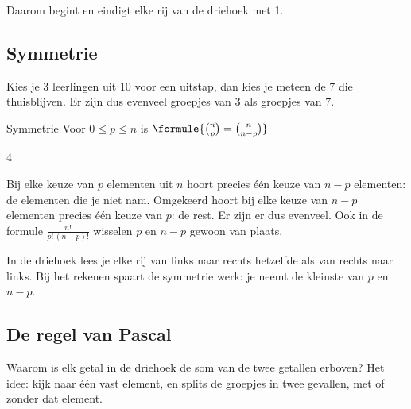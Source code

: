 Daarom begint en eindigt elke rij van de driehoek met 1.

\subsection{Symmetrie}

Kies je 3 leerlingen uit 10 voor een uitstap, dan kies je meteen de 7 die thuisblijven. Er zijn dus evenveel groepjes van 3 als groepjes van 7.

\begin{theorie}
\begin{stelling}{Symmetrie}
Voor $0 \leqslant p \leqslant n$ is \quad $\formule{\binom{n}{p} = \binom{n}{n - p}}$
\end{stelling}

\begin{alleenvoor}{4}
\begin{bewijs}
Bij elke keuze van $p$ elementen uit $n$ hoort precies één keuze van $n - p$ elementen: de elementen die je niet nam. Omgekeerd hoort bij elke keuze van $n - p$ elementen precies één keuze van $p$: de rest. Er zijn er dus evenveel. Ook in de formule $\frac{n!}{p!\,(n - p)!}$ wisselen $p$ en $n - p$ gewoon van plaats.
\end{bewijs}
\end{alleenvoor}
\end{theorie}

In de driehoek lees je elke rij van links naar rechts hetzelfde als van rechts naar links. Bij het rekenen spaart de symmetrie werk: je neemt de kleinste van $p$ en $n - p$.


\begin{oefeningen}
\end{oefeningen}

\subsection{De regel van Pascal}

Waarom is elk getal in de driehoek de som van de twee getallen erboven? Het idee: kijk naar één vast element, en splits de groepjes in twee gevallen, met of zonder dat element.

